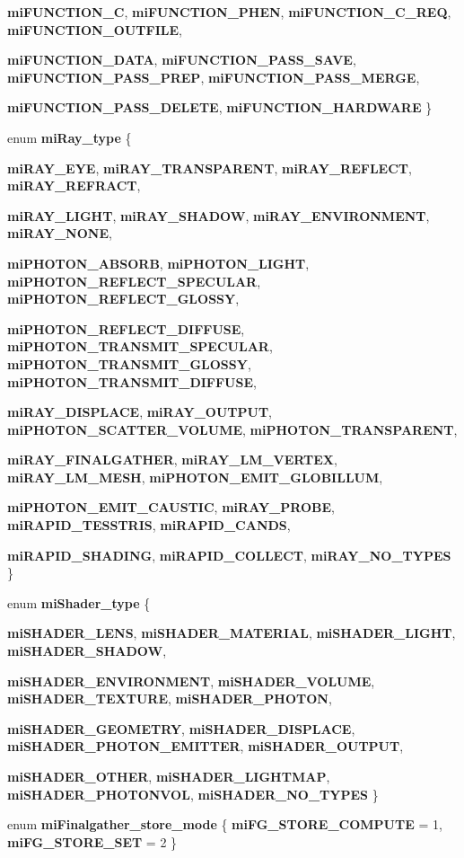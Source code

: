 \begin{CompactItemize}
$${\bf mi\-FUNCTION\_\-C}, 
{\bf mi\-FUNCTION\_\-PHEN}, 
{\bf mi\-FUNCTION\_\-C\_\-REQ}, 
{\bf mi\-FUNCTION\_\-OUTFILE}, 
\par
{\bf mi\-FUNCTION\_\-DATA}, 
{\bf mi\-FUNCTION\_\-PASS\_\-SAVE}, 
{\bf mi\-FUNCTION\_\-PASS\_\-PREP}, 
{\bf mi\-FUNCTION\_\-PASS\_\-MERGE}, 
\par
{\bf mi\-FUNCTION\_\-PASS\_\-DELETE}, 
{\bf mi\-FUNCTION\_\-HARDWARE}
 \}
\item 
enum {\bf mi\-Ray\_\-type} \{ \par
{\bf mi\-RAY\_\-EYE}, 
{\bf mi\-RAY\_\-TRANSPARENT}, 
{\bf mi\-RAY\_\-REFLECT}, 
{\bf mi\-RAY\_\-REFRACT}, 
\par
{\bf mi\-RAY\_\-LIGHT}, 
{\bf mi\-RAY\_\-SHADOW}, 
{\bf mi\-RAY\_\-ENVIRONMENT}, 
{\bf mi\-RAY\_\-NONE}, 
\par
{\bf mi\-PHOTON\_\-ABSORB}, 
{\bf mi\-PHOTON\_\-LIGHT}, 
{\bf mi\-PHOTON\_\-REFLECT\_\-SPECULAR}, 
{\bf mi\-PHOTON\_\-REFLECT\_\-GLOSSY}, 
\par
{\bf mi\-PHOTON\_\-REFLECT\_\-DIFFUSE}, 
{\bf mi\-PHOTON\_\-TRANSMIT\_\-SPECULAR}, 
{\bf mi\-PHOTON\_\-TRANSMIT\_\-GLOSSY}, 
{\bf mi\-PHOTON\_\-TRANSMIT\_\-DIFFUSE}, 
\par
{\bf mi\-RAY\_\-DISPLACE}, 
{\bf mi\-RAY\_\-OUTPUT}, 
{\bf mi\-PHOTON\_\-SCATTER\_\-VOLUME}, 
{\bf mi\-PHOTON\_\-TRANSPARENT}, 
\par
{\bf mi\-RAY\_\-FINALGATHER}, 
{\bf mi\-RAY\_\-LM\_\-VERTEX}, 
{\bf mi\-RAY\_\-LM\_\-MESH}, 
{\bf mi\-PHOTON\_\-EMIT\_\-GLOBILLUM}, 
\par
{\bf mi\-PHOTON\_\-EMIT\_\-CAUSTIC}, 
{\bf mi\-RAY\_\-PROBE}, 
{\bf mi\-RAPID\_\-TESSTRIS}, 
{\bf mi\-RAPID\_\-CANDS}, 
\par
{\bf mi\-RAPID\_\-SHADING}, 
{\bf mi\-RAPID\_\-COLLECT}, 
{\bf mi\-RAY\_\-NO\_\-TYPES}
 \}
\item 
enum {\bf mi\-Shader\_\-type} \{ \par
{\bf mi\-SHADER\_\-LENS}, 
{\bf mi\-SHADER\_\-MATERIAL}, 
{\bf mi\-SHADER\_\-LIGHT}, 
{\bf mi\-SHADER\_\-SHADOW}, 
\par
{\bf mi\-SHADER\_\-ENVIRONMENT}, 
{\bf mi\-SHADER\_\-VOLUME}, 
{\bf mi\-SHADER\_\-TEXTURE}, 
{\bf mi\-SHADER\_\-PHOTON}, 
\par
{\bf mi\-SHADER\_\-GEOMETRY}, 
{\bf mi\-SHADER\_\-DISPLACE}, 
{\bf mi\-SHADER\_\-PHOTON\_\-EMITTER}, 
{\bf mi\-SHADER\_\-OUTPUT}, 
\par
{\bf mi\-SHADER\_\-OTHER}, 
{\bf mi\-SHADER\_\-LIGHTMAP}, 
{\bf mi\-SHADER\_\-PHOTONVOL}, 
{\bf mi\-SHADER\_\-NO\_\-TYPES}
 \}
\item 
enum {\bf mi\-Finalgather\_\-store\_\-mode} \{ {\bf mi\-FG\_\-STORE\_\-COMPUTE} =  1, 
{\bf mi\-FG\_\-STORE\_\-SET} =  2
 \}
\end{CompactItemize}
